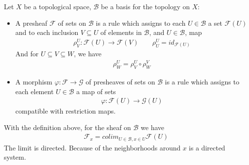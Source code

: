 \documentclass[Total.tex]{subfiles}
\begin{document}
				\begin{Def}
					Let $X$ be a topological space, $\mathcal{B}$ be a basis for the topology on $X$:
					
					\begin{itemize}
						\item A presheaf $\mathcal{F}$ of sets on $\mathcal{B}$ is a rule which assigns to each $U\in \mathcal{B}$ a set $\mathcal{F}(U)$ and to each inclusion $V\subseteq U$ of elements in $\mathcal{B}$, and $U\in \mathcal{B}$, map
						\begin{gather*}
							\rho_V^U:\mathcal{F}(U)\rightarrow \mathcal{F}(V)\qquad \rho^U_U=id_{\mathcal{F}(U)}
						\end{gather*}
						And for $U\subseteq V\subseteq W$, we have
						\begin{gather*}
							\rho_W^U=\rho_V^U\circ \rho_W^V
						\end{gather*}
						\item A morphism $\varphi:\mathcal{F}\rightarrow \mathcal{G}$ of presheaves of sets on $\mathcal{B}$ is a rule which assigns to each element $U\in \mathcal{B}$ a map of sets
						\begin{gather*}
							\varphi:\mathcal{F}(U)\rightarrow \mathcal{G}(U)
						\end{gather*}
						compatible with restriction maps.
					\end{itemize}
				\end{Def}
				With the definition above, for the sheaf on $\mathcal{B}$ we have
				\begin{gather*}
					\mathcal{F}_x=colim_{U\in \mathcal{B},x\in U} \mathcal{F}(U)
				\end{gather*}
				The limit is directed. Because of the neighborhoods around $x$ is a directed system.
				
\end{document}
